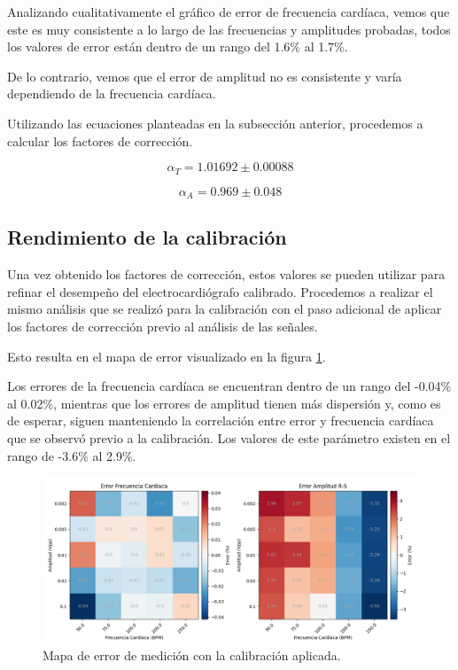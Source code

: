 \documentclass[conference]{IEEEtran}
\begin{document}
 
Analizando cualitativamente el gráfico de error de frecuencia cardíaca, vemos que este
es muy consistente a lo largo de las frecuencias y amplitudes probadas,
todos los valores de error están dentro de un rango del 1.6\% al 1.7\%.

De lo contrario, vemos que el error de amplitud no es consistente y varía
dependiendo de la frecuencia cardíaca.

Utilizando las ecuaciones planteadas en la subsección anterior, procedemos a calcular
los factores de corrección.

\boldmath
$$ \alpha_{T} = 1.01692 \pm 0.00088 $$

$$ \alpha_{A} = 0.969 \pm 0.048 $$
\unboldmath 



\subsection{Rendimiento de la calibración}

Una vez obtenido los factores de corrección, estos valores se pueden utilizar
para refinar el desempeño del electrocardiógrafo calibrado. Procedemos a realizar
el mismo análisis que se realizó para la calibración con el paso adicional de
aplicar los factores de corrección previo al análisis de las señales.

Esto resulta en el mapa de error visualizado en la figura
\ref{fig:plot_errpr_con_calib}.

Los errores de la frecuencia cardíaca se encuentran dentro de un rango del -0.04\% al
0.02\%, mientras que los errores de amplitud tienen más dispersión y, como es de
esperar, siguen manteniendo la correlación entre error y frecuencia cardíaca que 
se observó previo a la calibración. Los valores de este parámetro existen en el 
rango de -3.6\% al 2.9\%.



\begin{figure}[t]
    \centering
    \includegraphics[width=\textwidth]{figs/plot_error_con_calib.png}
    \caption{Mapa de error de medición con la calibración aplicada.}
    \label{fig:plot_errpr_con_calib}

\end{figure}
\end{document}
